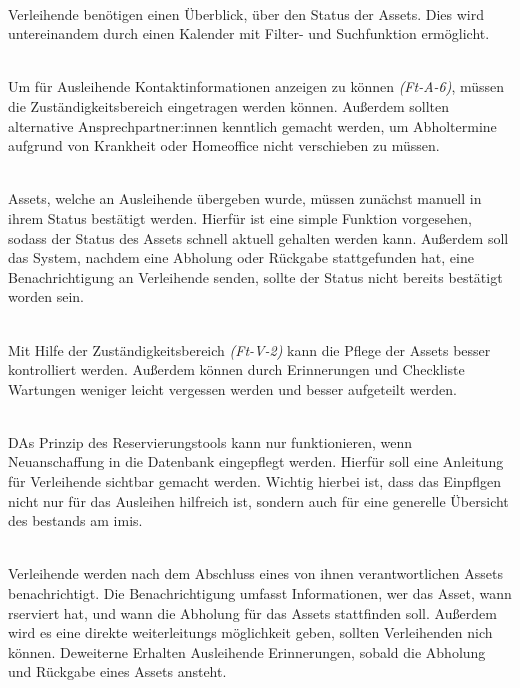     {\sffamily\color{maincolor}{Ft-V-1 |  Verfügbarkeit von Assets }}\\
Verleihende benötigen einen Überblick, über den Status der Assets. Dies wird
untereinandem durch einen Kalender mit Filter- und Suchfunktion ermöglicht.

{\sffamily\color{maincolor}{Ft-V-2 | Zuständigkeitsbereich }}\\
Um für Ausleihende Kontaktinformationen anzeigen zu können \textit{(Ft-A-6)},
müssen die Zuständigkeitsbereich eingetragen werden können. Außerdem sollten
alternative Ansprechpartner:innen kenntlich gemacht werden, um Abholtermine
aufgrund von Krankheit oder Homeoffice nicht verschieben zu müssen.


{\sffamily\color{maincolor}{Ft-V-3 | Bearbeiten des Assetstatus }}\\
Assets, welche an Ausleihende übergeben wurde, müssen zunächst manuell in ihrem
Status bestätigt werden. Hierfür ist eine simple Funktion vorgesehen, sodass der
Status des Assets schnell aktuell gehalten werden kann. Außerdem soll das
System, nachdem eine Abholung oder Rückgabe stattgefunden hat, eine
Benachrichtigung an Verleihende senden, sollte der Status nicht bereits
bestätigt worden sein.

    {\sffamily\color{maincolor}{Ft-V-4 | Pflege von Assets   }}\\
Mit Hilfe der Zuständigkeitsbereich \textit{(Ft-V-2)} kann die Pflege der Assets
besser kontrolliert werden. Außerdem können durch Erinnerungen und Checkliste
Wartungen weniger leicht vergessen werden und besser aufgeteilt werden.

    {\sffamily\color{maincolor}{Ft-V-5 | Pflege der Datenbank }}\\
DAs Prinzip des Reservierungstools kann nur funktionieren, wenn Neuanschaffung
in die Datenbank eingepflegt werden. Hierfür soll eine Anleitung für Verleihende
sichtbar gemacht werden. Wichtig hierbei ist, dass das Einpflgen nicht nur für
das Ausleihen hilfreich ist, sondern auch für eine generelle Übersicht des
bestands am \ac{imis}.



{\sffamily\color{maincolor}{Ft-VA-2 | Benachrichtigungen \& Erinnerungen
}}\\
Verleihende werden nach dem Abschluss eines von ihnen verantwortlichen Assets
benachrichtigt. Die Benachrichtigung umfasst Informationen, wer das Asset, wann
rserviert hat, und wann die Abholung für das Assets stattfinden soll. Außerdem
wird es eine direkte weiterleitungs möglichkeit geben, sollten Verleihenden nich
können. Deweiterne Erhalten Ausleihende Erinnerungen, sobald die Abholung und
Rückgabe eines Assets ansteht.

